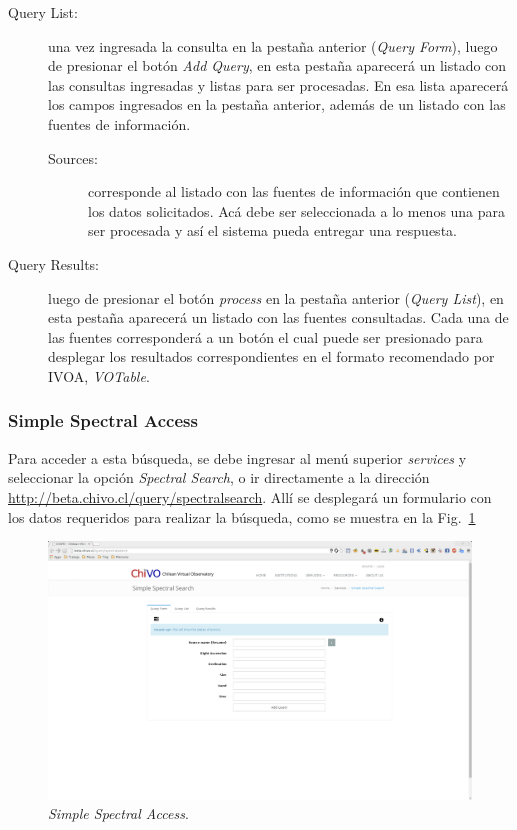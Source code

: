 \begin{description}
  \item [Query List:] una vez ingresada la consulta en la pestaña
    anterior (\emph{Query Form}), luego de presionar el botón
    \emph{Add Query}, en esta pestaña aparecerá un listado con las
    consultas ingresadas y listas para ser procesadas. En esa lista
    aparecerá los campos ingresados en la pestaña anterior, además de
    un listado con las fuentes de información.
    \begin{description}
      \item [Sources:] corresponde al listado con las fuentes de
	información que contienen los datos solicitados. Acá debe ser
	seleccionada a lo menos una para ser procesada y así el
	sistema pueda entregar una respuesta.
    \end{description}  
  \item [Query Results:] luego de presionar el botón \emph{process} en
    la pestaña anterior (\emph{Query List}), en esta pestaña
    aparecerá un listado con las fuentes consultadas. Cada una de las
    fuentes corresponderá a un botón el cual puede ser presionado para
    desplegar los resultados correspondientes en el formato
    recomendado por IVOA, \emph{VOTable}.
\end{description}


\subsubsection{Simple Spectral Access}

Para acceder a esta búsqueda, se debe ingresar al menú superior
\emph{services} y seleccionar la opción \emph{Spectral Search}, o ir
directamente a la dirección
\url{http://beta.chivo.cl/query/spectralsearch}. Allí se desplegará un
formulario con los datos requeridos para realizar la búsqueda, como se
muestra en la Fig.~\ref{img:ssa}

\begin{figure}[ht!]
    \begin{center}
	\includegraphics[scale=.2]{img/ssa}
    \end{center}
    \caption{\emph{Simple Spectral Access}.}\label{img:ssa}
\end{figure}

